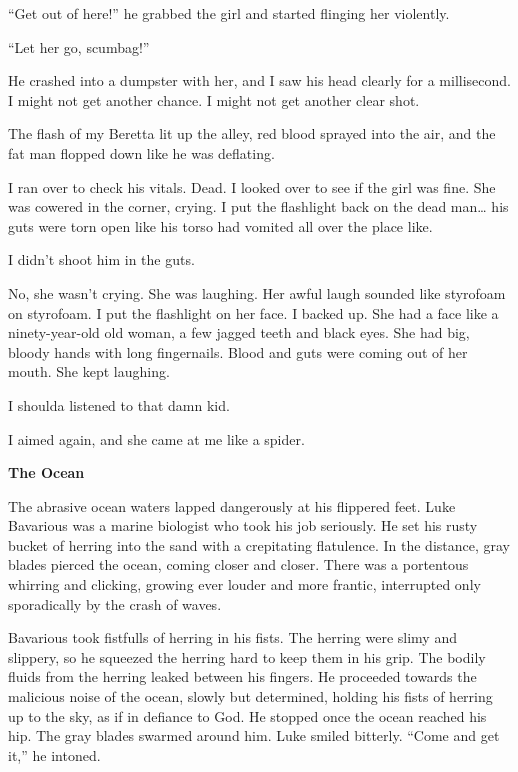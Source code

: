 ``Get out of here!'' he grabbed the girl and started
flinging her violently.



``Let her go, scumbag!''



He crashed into a dumpster with her, and I saw his head clearly for
a millisecond. I might not get another chance. I might not get
another clear shot.



The flash of my Beretta lit up the alley, red blood sprayed into
the air, and the fat man flopped down like he was deflating.



I ran over to check his vitals. Dead. I looked over to see if the
girl was fine. She was cowered in the corner, crying. I put the
flashlight back on the dead man{\ldots} his guts were torn open like his
torso had vomited all over the place like.



I didn't shoot him in the guts.



No, she wasn't crying. She was laughing. Her awful laugh
sounded like styrofoam on styrofoam. I put the flashlight on her
face. I backed up. She had a face like a ninety-year-old old woman,
a few jagged teeth and black eyes. She had big, bloody hands with
long fingernails. Blood and guts were coming out of her mouth. She
kept laughing.



I shoulda listened to that damn kid.



I aimed again, and she came at me like a spider.


 





{\bf The Ocean}

The abrasive ocean waters lapped dangerously at his flippered feet.
Luke Bavarious was a marine biologist who took his job seriously.
He set his rusty bucket of herring into the sand with a crepitating
flatulence. In the distance, gray blades pierced the ocean, coming
closer and closer. There was a portentous whirring and clicking,
growing ever louder and more frantic, interrupted only sporadically
by the crash of waves.



Bavarious took fistfulls of herring in his fists. The herring were
slimy and slippery, so he squeezed the herring hard to keep them in
his grip. The bodily fluids from the herring leaked between his
fingers. He proceeded towards the malicious noise of the ocean,
slowly but determined, holding his fists of herring up to the sky,
as if in defiance to God. He stopped once the ocean reached his
hip. The gray blades swarmed around him. Luke smiled bitterly.
``Come and get it,'' he intoned.



